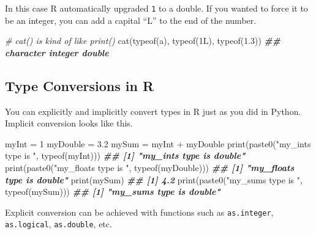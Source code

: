 \documentclass[
  12pt,
]{krantz}
\makeatletter
\newenvironment{Shaded}{\begin{snugshade}}{\end{snugshade}}
\newcommand{\CommentTok}[1]{\textcolor[rgb]{0.37,0.37,0.37}{\textit{#1}}}
\newcommand{\DecValTok}[1]{\textcolor[rgb]{0.06,0.06,0.06}{#1}}
\newcommand{\DocumentationTok}[1]{\textcolor[rgb]{0.37,0.37,0.37}{\textbf{\textit{#1}}}}
\newcommand{\FloatTok}[1]{\textcolor[rgb]{0.06,0.06,0.06}{#1}}
\newcommand{\FunctionTok}[1]{\textcolor[rgb]{0,0,0}{#1}}
\newcommand{\NormalTok}[1]{#1}
\newcommand{\OtherTok}[1]{\textcolor[rgb]{0.37,0.37,0.37}{#1}}
\newcommand{\SpecialCharTok}[1]{\textcolor[rgb]{0,0,0}{#1}}
\newcommand{\StringTok}[1]{\textcolor[rgb]{0.5,0.5,0.5}{#1}}
\newenvironment{kframe}{%
\medskip{}
\setlength{\fboxsep}{.8em}
 \def\at@end@of@kframe{}%
 \ifinner\ifhmode%
  \def\at@end@of@kframe{\end{minipage}}%
  \begin{minipage}{\columnwidth}%
 \fi\fi%
 \def\FrameCommand##1{\hskip\@totalleftmargin \hskip-\fboxsep
 \colorbox{shadecolor}{##1}\hskip-\fboxsep
     \hskip-\linewidth \hskip-\@totalleftmargin \hskip\columnwidth}%
 \MakeFramed {\advance\hsize-\width
   \@totalleftmargin\z@ \linewidth\hsize
   \@setminipage}}%
 {\par\unskip\endMakeFramed%
 \at@end@of@kframe}
\renewenvironment{Shaded}{\begin{kframe}}{\end{kframe}}
\makeatother
\begin{document}
In this case R automatically upgraded \texttt{1} to a double. If you wanted to force it to be an integer, you can add a capital ``L'' to the end of the number.

\begin{Shaded}
\begin{Highlighting}[]
\CommentTok{\# cat() is kind of like print()}
\FunctionTok{cat}\NormalTok{(}\FunctionTok{typeof}\NormalTok{(}\StringTok{\textquotesingle{}a\textquotesingle{}}\NormalTok{), }\FunctionTok{typeof}\NormalTok{(1L), }\FunctionTok{typeof}\NormalTok{(}\FloatTok{1.3}\NormalTok{))}
\DocumentationTok{\#\# character integer double}
\end{Highlighting}
\end{Shaded}

\hypertarget{type-conversions-in-r}{%
\subsection{Type Conversions in R}\label{type-conversions-in-r}}

You can explicitly and implicitly convert types in R just as you did in Python. Implicit conversion looks like this.

\begin{Shaded}
\begin{Highlighting}[]
\NormalTok{myInt }\OtherTok{=} \DecValTok{1}
\NormalTok{myDouble }\OtherTok{=} \FloatTok{3.2}
\NormalTok{mySum }\OtherTok{=}\NormalTok{ myInt }\SpecialCharTok{+}\NormalTok{ myDouble}
\FunctionTok{print}\NormalTok{(}\FunctionTok{paste0}\NormalTok{(}\StringTok{"my\_int\textquotesingle{}s type is "}\NormalTok{, }\FunctionTok{typeof}\NormalTok{(myInt)))}
\DocumentationTok{\#\# [1] "my\_int\textquotesingle{}s type is double"}
\FunctionTok{print}\NormalTok{(}\FunctionTok{paste0}\NormalTok{(}\StringTok{"my\_float\textquotesingle{}s type is "}\NormalTok{, }\FunctionTok{typeof}\NormalTok{(myDouble)))}
\DocumentationTok{\#\# [1] "my\_float\textquotesingle{}s type is double"}
\FunctionTok{print}\NormalTok{(mySum)}
\DocumentationTok{\#\# [1] 4.2}
\FunctionTok{print}\NormalTok{(}\FunctionTok{paste0}\NormalTok{(}\StringTok{"my\_sum\textquotesingle{}s type is "}\NormalTok{, }\FunctionTok{typeof}\NormalTok{(mySum)))}
\DocumentationTok{\#\# [1] "my\_sum\textquotesingle{}s type is double"}
\end{Highlighting}
\end{Shaded}

Explicit conversion can be achieved with functions such as \texttt{as.integer}, \texttt{as.logical}, \texttt{as.double}, etc.
\end{document}
